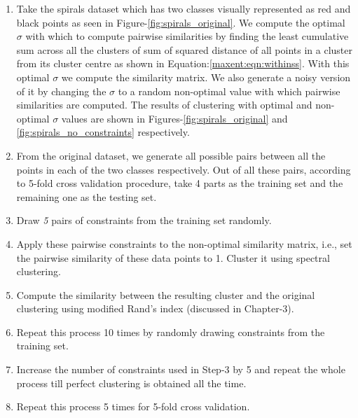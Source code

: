 \begin{enumerate}
 \item Take the spirals dataset which has two classes visually represented as red and black points as seen in Figure-\ref{fig:spirals_original}. We compute the optimal $\sigma$ with which to compute pairwise similarities by finding the least cumulative sum across all the clusters of sum of squared 
distance of all points in a cluster from its cluster centre as shown in Equation:\ref{maxent:eqn:withinss}. With this optimal $\sigma$ we compute the similarity matrix. We also generate a noisy version of it by changing the $\sigma$ to a random non-optimal value with which pairwise similarities are computed. The results of clustering with optimal and non-optimal $\sigma$ values are shown in Figures-\ref{fig:spirals_original} and \ref{fig:spirals_no_constraints} respectively.
 \item From the original dataset, we generate all possible pairs between all the points in each of the two classes respectively. Out of all these pairs, according to 5-fold cross validation procedure, take 4 parts as the training set and the remaining one as the testing set.
 \item Draw \textit{5} pairs of constraints from the training set randomly.
 \item Apply these pairwise constraints to the non-optimal similarity matrix, i.e., set the pairwise similarity of these data points to 1. Cluster it using spectral clustering.
 \item Compute the similarity between the resulting cluster and the original clustering using modified Rand's index (discussed in Chapter-3).
 \item Repeat this process 10 times by randomly drawing constraints from the training set.
 \item Increase the number of constraints used in Step-3 by 5 and repeat the whole process till perfect clustering is obtained all the time.
 \item Repeat this process 5 times for 5-fold cross validation.
 \end{enumerate}


